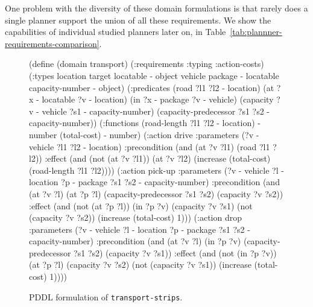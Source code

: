 One problem with the diversity of these domain formulations is that rarely does
a single planner support the union of all these requirements.
We show the capabilities of individual studied planners
later on, in Table~\ref{tab:plannner-requirements-comparison}.


\begin{figure}[tbp]
\begin{code}
(define (domain transport)
  (:requirements :typing :action-costs)
  (:types
        location target locatable - object
        vehicle package - locatable
        capacity-number - object)
  (:predicates 
     (road ?l1 ?l2 - location)
     (at ?x - locatable ?v - location)
     (in ?x - package ?v - vehicle)
     (capacity ?v - vehicle ?s1 - capacity-number)
     (capacity-predecessor ?s1 ?s2 - capacity-number))
  (:functions
     (road-length ?l1 ?l2 - location) - number
     (total-cost) - number)     
  (:action drive
    :parameters (?v - vehicle ?l1 ?l2 - location)
    :precondition (and (at ?v ?l1) (road ?l1 ?l2))
    :effect (and (not (at ?v ?l1)) (at ?v ?l2)
        (increase (total-cost) (road-length ?l1 ?l2))))        
 (:action pick-up
    :parameters (?v - vehicle ?l - location ?p - package
                 ?s1 ?s2 - capacity-number)
    :precondition (and (at ?v ?l) (at ?p ?l)
        (capacity-predecessor ?s1 ?s2) (capacity ?v ?s2))
    :effect (and (not (at ?p ?l)) (in ?p ?v) (capacity ?v ?s1)
        (not (capacity ?v ?s2)) (increase (total-cost) 1)))
  (:action drop
    :parameters (?v - vehicle ?l - location ?p - package
                 ?s1 ?s2 - capacity-number)
    :precondition (and (at ?v ?l) (in ?p ?v)
        (capacity-predecessor ?s1 ?s2) (capacity ?v ?s1))
    :effect (and (not (in ?p ?v)) (at ?p ?l) (capacity ?v ?s2)
        (not (capacity ?v ?s1)) (increase (total-cost) 1))))
\end{code}
\caption{PDDL formulation of \texttt{transport-strips}.}
\label{code:pddl-strips}
\end{figure}

